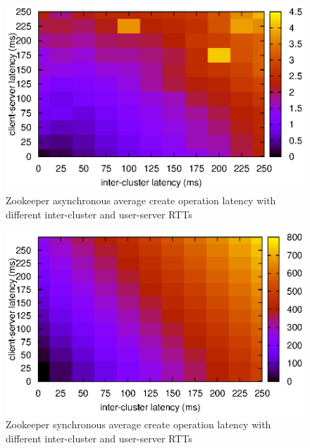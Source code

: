 \begin{figure}[ht]
\centering
\includegraphics[scale=0.75]{img/async_ops_latencies_heatmap.eps}
\caption{Zookeeper asynchronous average create operation latency with different inter-cluster and user-server RTTs}
\label{fig:async_heatmap}
\end{figure}

\begin{figure}[ht]
\centering
\includegraphics[scale=0.75]{img/sync_ops_latencies_heatmap.eps}
\caption{Zookeeper synchronous average create operation latency with different inter-cluster and user-server RTTs}
\label{fig:sync_heatmap}
\end{figure}

